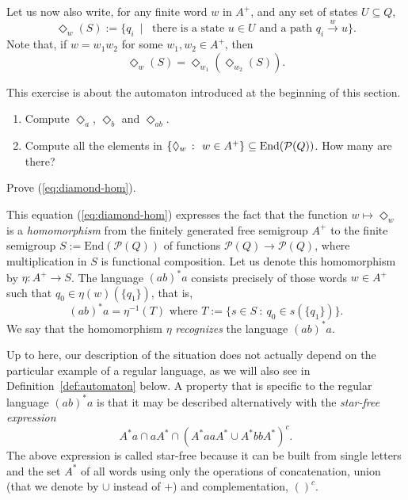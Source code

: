 Let us now also write, for any finite word $w$ in $A^+$, and any set of states $U \subseteq Q$,
\[ \Diamond_w(S) := \{ q_i \ \mid \ \text{ there is a state } u \in U \text{ and a path } q_i \stackrel{w}{\to} u \}.\]
Note that, if $w = w_1w_2$ for some $w_1, w_2 \in A^+$, then
\begin{equation}\label{eq:diamond-hom}
\Diamond_w(S) = \Diamond_{w_1} (\Diamond_{w_2}(S)).
\end{equation}

\begin{exercise}\label{exe:diamond}
  This exercise is about the automaton introduced at the beginning of this section.
  \begin{enumerate}
\item \easy Compute $\Diamond_a$, $\Diamond_b$ and $\Diamond_{ab}$.
\item \medium Compute all the elements in $\{ \Diamond_w \ \colon \ w \in A^+\} \subseteq \mathrm{End}(\mathcal{P}(Q))$. How many are there?
  \end{enumerate}
\end{exercise}
\begin{exercise}\easy
 Prove (\ref{eq:diamond-hom}).
\end{exercise}

This equation (\ref{eq:diamond-hom}) expresses the fact that the function $w \mapsto \Diamond_w$ is a \emph{homomorphism} from the finitely generated free semigroup $A^+$ to the finite semigroup $S := \mathrm{End}(\mathcal{P}(Q))$ of functions $\mathcal{P}(Q) \to \mathcal{P}(Q)$, where multiplication in $S$ is functional composition. Let us denote this homomorphism by $\eta \colon A^+ \to S$. The language $(ab)^*a$ consists precisely of those words $w \in A^+$ such that $q_0 \in \eta(w)(\{q_1\})$, that is,
\[ (ab)^*a = \eta^{-1}(T) \text{ where } T := \{s \in S \ \colon \ q_0 \in s(\{q_1\})\}.\]
We say that the homomorphism $\eta$ \emph{recognizes} the language $(ab)^*a$. 

Up to here, our description of the situation does not actually  depend on the particular example of a regular language, as we will also see in Definition~\ref{def:automaton} below. A property that is specific to the regular language $(ab)^*a$ is that it may be described alternatively with the \emph{star-free expression}
\[  A^*a \cap aA^* \cap (A^*aaA^* \cup A^*bbA^*)^c.\]
The above expression is called star-free because it can be built from  single letters and the set $A^*$ of all words using only the operations of concatenation, union (that we denote by $\cup$ instead of $+$) and complementation, $()^c$.
%

